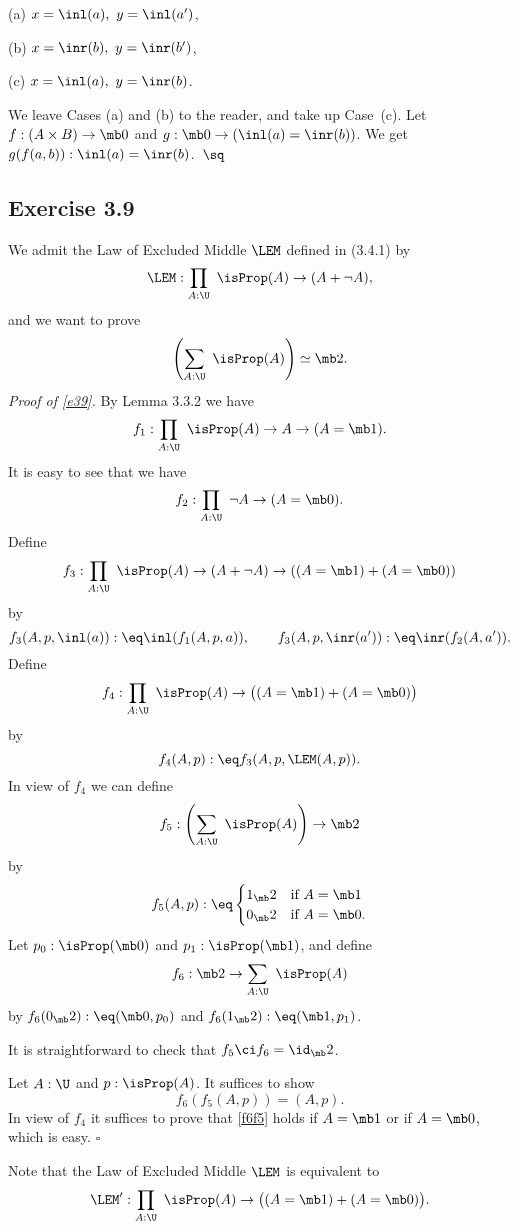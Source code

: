 \documentclass[12pt]{article}
\begin{document}
(a) $x=\inl(a),\ y=\inl(a')$,

(b) $x=\inr(b),\ y=\inr(b')$,

(c) $x=\inl(a),\ y=\inr(b)$.

\nn We leave Cases (a) and (b) to the reader, and take up Case~(c). Let $f:(A\times B)\to\mb0$ and $g:\mb0\to(\inl(a)=\inr(b))$. We get $g(f(a,b)):\inl(a)=\inr(b)$.\ $\sq$


\subsection{Exercise 3.9}

We admit the Law of Excluded Middle $\LEM$ defined in (3.4.1) by 
$$
\LEM:\prod_{A:\U}\ \isProp(A)\to(A+\neg A),
$$ 
and we want to prove 
\begin{equation}\label{e39}
\left(\sum_{A:\U}\ \isProp(A)\right)\simeq\mb2.
\end{equation}
\emph{Proof of \eqref{e39}.} By Lemma 3.3.2 we have 
$$
f_1:\prod_{A:\U}\ \isProp(A)\to A\to(A=\mb1). 
$$ 
It is easy to see that we have 
$$
f_2:\prod_{A:\U}\ \neg A\to(A=\mb0). 
$$ 
Define 
$$
f_3:\prod_{A:\U}\ \isProp(A)\to(A+\neg A)\to((A=\mb1)+(A=\mb0))
$$ 
by 
$$
f_3(A,p,\inl(a)):\eq\inl(f_1(A,p,a)),\qquad f_3(A,p,\inr(a')):\eq\inr(f_2(A,a')).
$$ 
Define 
$$
f_4:\prod_{A:\U}\ \isProp(A)\to\big((A=\mb1)+(A=\mb0)\big)
$$ 
by 
$$
f_4(A,p):\eq f_3(A,p,\LEM(A,p)).
$$ 
In view of $f_4$ we can define 
$$
f_5:\left(\sum_{A:\U}\ \isProp(A)\right)\to\mb2
$$ 
by 
$$
f_5(A,p):\eq
\begin{cases}
1_\mb2&\text{if }A=\mb1\\
0_\mb2&\text{if }A=\mb0.
\end{cases}
$$ 
Let $p_0:\isProp(\mb0)$ and $p_1:\isProp(\mb1)$, and define 
$$
f_6:\mb2\to\sum_{A:\U}\ \isProp(A)
$$ 
by $f_6(0_\mb2):\eq(\mb0,p_0)$ and $f_6(1_\mb2):\eq(\mb1,p_1)$.

It is straightforward to check that $f_5\ci f_6=\id_\mb2$. 

Let $A:\U$ and $p:\isProp(A)$. It suffices to show 
\begin{equation}\label{f6f5}
f_6(f_5(A,p))=(A,p).
\end{equation}
In view of $f_4$ it suffices to prove that \eqref{f6f5} holds if $A=\mb1$ or if $A=\mb0$, which is easy. $\square$ 

Note that the Law of Excluded Middle $\LEM$ is equivalent to 
$$
\LEM':\prod_{A:\U}\ \isProp(A)\to\big((A=\mb1)+(A=\mb0)\big).
$$ 
\end{document}
